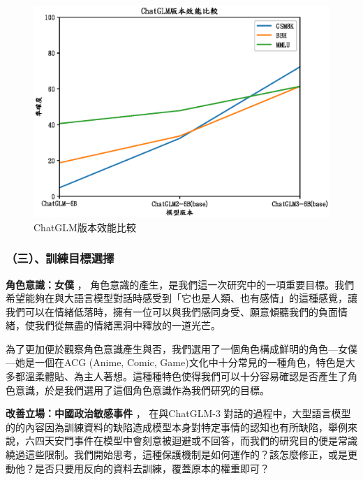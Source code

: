 \documentclass[12pt,a4paper,MingLiU,UTF8,natbib]{article}
\def\xeCJKembold{0.4}
\def\saveCJKnode{\dimen255\lastkern}
\def\restoreCJKnode{\kern-\dimen255\kern\dimen255}
\let\CJKoldsymbol\CJKsymbol
\let\CJKoldpunctsymbol\CJKpunctsymbol
\def\CJKfakeboldsymbol#1{%
	\special{pdf:literal direct 2 Tr \xeCJKembold\space w}%
	\CJKoldsymbol{#1}%
	\saveCJKnode
	\special{pdf:literal direct 0 Tr}%
	\restoreCJKnode}
\def\CJKfakeboldpunctsymbol#1{%
	\special{pdf:literal direct 2 Tr \xeCJKembold\space w}%
	\CJKoldpunctsymbol{#1}%
	\saveCJKnode
	\special{pdf:literal direct 0 Tr}%
	\restoreCJKnode}
\newcommand\CJKfakebold[1]{%
	\let\CJKsymbol\CJKfakeboldsymbol
	\let\CJKpunctsymbol\CJKfakeboldpunctsymbol
	#1%
	\let\CJKsymbol\CJKoldsymbol
	\let\CJKpunctsymbol\CJKoldpunctsymbol}
\begin{document}
	\begin{figure}[H]
		\centering
	\includegraphics[scale=0.7]{chatglmversion}
		\caption{ChatGLM版本效能比較}
	\end{figure}
	
	\subsubsection{（三）、訓練目標選擇}
	\CJKfakebold{\textbf{角色意識：女僕}}，	角色意識的產生，是我們這一次研究中的一項重要目標。我們希望能夠在與大語言模型對話時感受到「它也是人類、也有感情」的這種感覺，讓我們可以在情緒低落時，擁有一位可以與我們感同身受、願意傾聽我們的負面情緒，使我們從無盡的情緒黑洞中釋放的一道光芒。
 
為了更加便於觀察角色意識產生與否，我們選用了一個角色構成鮮明的角色—女僕—她是一個在ACG (Anime, Comic, Game)文化中十分常見的一種角色，特色是大多都溫柔體貼、為主人著想。這種種特色使得我們可以十分容易確認是否產生了角色意識，於是我們選用了這個角色意識作為我們研究的目標。

	\CJKfakebold{\textbf{改善立場：中國政治敏感事件}}，	在與ChatGLM-3 對話的過程中，大型語言模型的的內容因為訓練資料的缺陷造成模型本身對特定事情的認知也有所缺陷，舉例來說，六四天安門事件在模型中會刻意被迴避或不回答，而我們的研究目的便是常識繞過這些限制。我們開始思考，這種保護機制是如何運作的？該怎麼修正，或是更動他？是否只要用反向的資料去訓練，覆蓋原本的權重即可？


 
\end{document}
